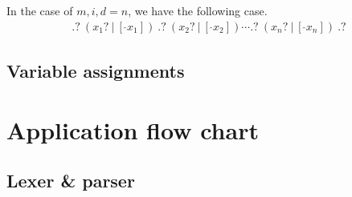 \documentclass[12pt]{article}
\begin{document}
In the case of $m, i, d = n$, we have the following case.
\begin{eqnarray}
	.?\ (x_1?\ |\ [\ \hat{}x_1])\ .?\ (x_2?\ |\ [\ \hat{} x_2]) \cdots .?\ (x_n?\ |\ [\ \hat{}x_n])\ .? 
\end{eqnarray}



\subsection{Variable assignments}



\section{Application flow chart}

\subsection{Lexer \& parser}
\end{document}
